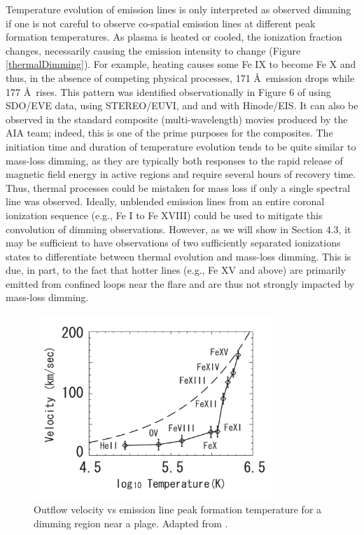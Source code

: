 Temperature evolution of emission lines is only interpreted as observed dimming if one is not careful to observe co-spatial emission lines at different peak formation temperatures. As plasma is heated or cooled, the ionization fraction changes, necessarily causing the emission intensity to change (Figure \ref{thermalDimming}). For example, heating causes some Fe IX to become Fe X and thus, in the absence of competing physical processes, 171 \AA\ emission drops while 177 \AA\ rises. This pattern was identified observationally in Figure 6 of \citet{Woods2011} using SDO/EVE data, \citet{Robbrecht2010} using STEREO/EUVI, and \citet{Jin2009} and \citet{Imada2007} with Hinode/EIS. It can also be observed in the standard composite (multi-wavelength) movies produced by the AIA team; indeed, this is one of the prime purposes for the composites. The initiation time and duration of temperature evolution tends to be quite similar to mass-loss dimming, as they are typically both responses to the rapid release of magnetic field energy in active regions and require several hours of recovery time. Thus, thermal processes could be mistaken for mass loss if only a single spectral line was observed. Ideally, unblended emission lines from an entire coronal ionization sequence (e.g., Fe I to Fe XVIII) could be used to mitigate this convolution of dimming observations. However, as we will show in Section 4.3, it may be sufficient to have observations of two sufficiently separated ionizations states to differentiate between thermal evolution and mass-loss dimming. This is due, in part, to the fact that hotter lines (e.g., Fe XV and above) are primarily emitted from confined loops near the flare and are thus not strongly impacted by mass-loss dimming. 

\begin{figure}[!ht]
    \caption[Outflow velocity vs temperature]{
        Outflow velocity vs emission line peak formation temperature for a dimming region near a plage. 
        Adapted from \citet{Imada2007}.
        }
    \begin{center}
        \includegraphics[width=90mm]{Images/UpflowVsTemperature.png}
    \end{center}
    \label{upflowVsTemperature}    
\end{figure}

